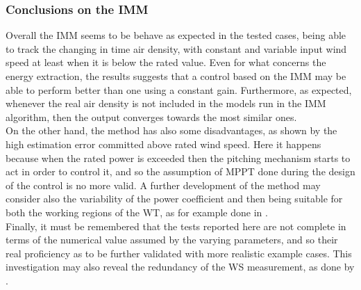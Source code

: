 \subsubsection{Conclusions on the IMM}
Overall the IMM seems to be behave as expected in the tested cases, being able to track the changing in time air density, with constant and variable input wind speed at least when it is below the rated value. Even for what concerns the energy extraction, the results suggests that a control based on the IMM may be able to perform better than one using a constant gain. Furthermore, as expected, whenever the real air density is not included in the models run in the IMM algorithm, then the output converges towards the most similar ones.\\
On the other hand, the method has also some disadvantages, as shown by the high estimation error committed above rated wind speed. Here it happens because when the rated power is exceeded then the pitching mechanism starts to act in order to control it, and so the assumption of MPPT done during the design of the control is no more valid. A further development of the method may consider also the variability of the power coefficient and then being suitable for both the working regions of the WT, as for example done in \cite{kalman_based_IMM}.\\
Finally, it must be remembered that the tests reported here are not complete in terms of the numerical value assumed by the varying parameters, and so their real proficiency as to be further validated with more realistic example cases. This investigation may also reveal the redundancy of the WS measurement, as done by \cite{kalman_based_IMM}.
